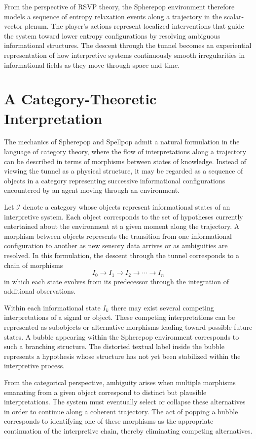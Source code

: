 \documentclass[11pt]{article}
\begin{document}
From the perspective of RSVP theory, the Spherepop environment therefore models a sequence of entropy relaxation events along a trajectory in the scalar-vector plenum. The player's actions represent localized interventions that guide the system toward lower entropy configurations by resolving ambiguous informational structures. The descent through the tunnel becomes an experiential representation of how interpretive systems continuously smooth irregularities in informational fields as they move through space and time.

\section{A Category-Theoretic Interpretation}

The mechanics of Spherepop and Spellpop admit a natural formulation in the language of category theory, where the flow of interpretations along a trajectory can be described in terms of morphisms between states of knowledge. Instead of viewing the tunnel as a physical structure, it may be regarded as a sequence of objects in a category representing successive informational configurations encountered by an agent moving through an environment.

Let $\mathcal{I}$ denote a category whose objects represent informational states of an interpretive system. Each object corresponds to the set of hypotheses currently entertained about the environment at a given moment along the trajectory. A morphism between objects represents the transition from one informational configuration to another as new sensory data arrives or as ambiguities are resolved. In this formulation, the descent through the tunnel corresponds to a chain of morphisms
\[
I_0 \to I_1 \to I_2 \to \cdots \to I_n
\]
in which each state evolves from its predecessor through the integration of additional observations.

Within each informational state $I_k$ there may exist several competing interpretations of a signal or object. These competing interpretations can be represented as subobjects or alternative morphisms leading toward possible future states. A bubble appearing within the Spherepop environment corresponds to such a branching structure. The distorted textual label inside the bubble represents a hypothesis whose structure has not yet been stabilized within the interpretive process.

From the categorical perspective, ambiguity arises when multiple morphisms emanating from a given object correspond to distinct but plausible interpretations. The system must eventually select or collapse these alternatives in order to continue along a coherent trajectory. The act of popping a bubble corresponds to identifying one of these morphisms as the appropriate continuation of the interpretive chain, thereby eliminating competing alternatives.
\end{document}
